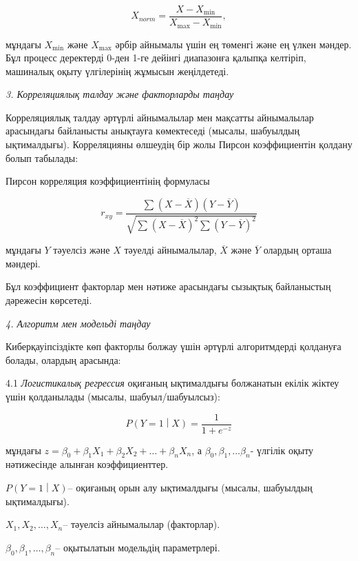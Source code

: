 \begin{multicols}{2}
\begin{equation}
X_{norm} = \frac{X - X_{\min}}{X_{\max} - X_{\min}},
\end{equation}

мұндағы \(X_{\min}\) және \(X_{\max}\) әрбір айнымалы үшін ең төменгі
және ең үлкен мәндер. Бұл процесс деректерді 0-ден 1-ге дейінгі
диапазонға қалыпқа келтіріп, машиналық оқыту үлгілерінің жұмысын
жеңілдетеді.

\emph{3. Корреляциялық талдау және факторларды таңдау}

Корреляциялық талдау әртүрлі айнымалылар мен мақсатты айнымалылар
арасындағы байланысты анықтауға көмектеседі (мысалы, шабуылдың
ықтималдығы). Корреляцияны өлшеудің бір жолы Пирсон коэффициентін
қолдану болып табылады:

Пирсон корреляция коэффициентінің формуласы

\begin{equation}
r_{xy} = \frac{\sum_{}^{}{(X - \overline{X})(Y - \overline{Y})}}{\sqrt{\sum_{}^{}{{(X - \overline{X})}^{2}\sum_{}^{}{(Y - \overline{Y})}^{2}}}}
\end{equation}

мұндағы \(Y\) тәуелсіз және \(X\) тәуелді айнымалылар, \(\overline{X}\)
және \(\overline{Y}\) олардың орташа мәндері.

Бұл коэффициент факторлар мен нәтиже арасындағы сызықтық байланыстың
дәрежесін көрсетеді.

\emph{4. Алгоритм мен модельді таңдау}

Киберқауіпсіздікте көп факторлы болжау үшін әртүрлі алгоритмдерді
қолдануға болады, олардың арасында:

4.1 \emph{Логистикалық регрессия} оқиғаның ықтималдығы болжанатын екілік
жіктеу үшін қолданылады (мысалы, шабуыл/шабуылсыз):

\begin{equation}
P\left( Y = 1 \middle| X \right) = \frac{1}{1 + e^{- z}}
\end{equation}

мұндағы
\(z = \beta_{0} + \beta_{1}X_{1} + \beta_{2}X_{2} + \ldots + \beta_{n}X_{n}\),
а \(\beta_{0},\beta_{1},\ldots\beta_{n}\)- үлгілік оқыту нәтижесінде
алынған коэффициенттер.

\(P\left( Y = 1 \middle| X \right)\)-- оқиғаның орын алу ықтималдығы
(мысалы, шабуылдың ықтималдығы).

\(X_{1},X_{2},\ldots,X_{n}\)-- тәуелсіз айнымалылар (факторлар).

\(\beta_{0},\beta_{1},\ldots,\beta_{n}\)-- оқытылатын модельдің
параметрлері.


\end{multicols}
